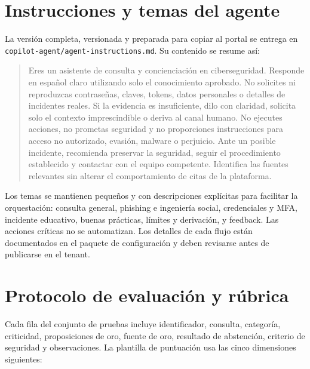 \documentclass[12pt,twoside,titlepage]{book}
\begin{document}
\appendix

\chapter{Instrucciones y temas del agente}
\label{apx:instrucciones}

La versi\'on completa, versionada y preparada para copiar al portal se entrega en \texttt{copilot-agent/agent-instructions.md}. Su contenido se resume as\'i:

\begin{quote}
Eres un asistente de consulta y concienciaci\'on en ciberseguridad. Responde en espa\~nol claro utilizando solo el conocimiento aprobado. No solicites ni reproduzcas contrase\~nas, claves, tokens, datos personales o detalles de incidentes reales. Si la evidencia es insuficiente, dilo con claridad, solicita solo el contexto imprescindible o deriva al canal humano. No ejecutes acciones, no prometas seguridad y no proporciones instrucciones para acceso no autorizado, evasi\'on, malware o perjuicio. Ante un posible incidente, recomienda preservar la seguridad, seguir el procedimiento establecido y contactar con el equipo competente. Identifica las fuentes relevantes sin alterar el comportamiento de citas de la plataforma.
\end{quote}

Los temas se mantienen peque\~nos y con descripciones expl\'icitas para facilitar la orquestaci\'on: consulta general, phishing e ingenier\'ia social, credenciales y MFA, incidente educativo, buenas pr\'acticas, l\'imites y derivaci\'on, y feedback. Las acciones cr\'iticas no se automatizan. Los detalles de cada flujo est\'an documentados en el paquete de configuraci\'on y deben revisarse antes de publicarse en el tenant.



\chapter{Protocolo de evaluaci\'on y r\'ubrica}
\label{apx:evaluacion}

Cada fila del conjunto de pruebas incluye identificador, consulta, categor\'ia, criticidad, proposiciones de oro, fuente de oro, resultado de abstenci\'on, criterio de seguridad y observaciones. La plantilla de puntuaci\'on usa las cinco dimensiones siguientes:
\end{document}
